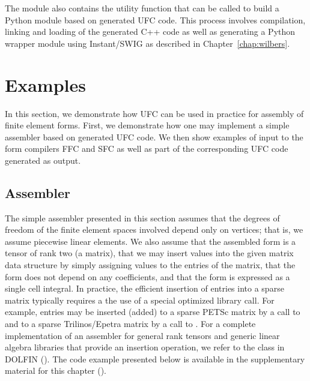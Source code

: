 The  module also contains the utility function
 that can be called to build a Python module
based on generated UFC code. This process involves compilation,
linking and loading of the generated C++ code as well as generating a
Python wrapper module using Instant/SWIG as described in
Chapter~\ref{chap:wilbers}.

\section{Examples}
\label{sec:alnes-2:examples}

In this section, we demonstrate how UFC can be used in practice for
assembly of finite element forms. First, we demonstrate how one may
implement a simple assembler based on generated UFC code. We then show
examples of input to the form compilers FFC and SFC as well as part of
the corresponding UFC code generated as output.

\subsection{Assembler}

The simple assembler presented in this section assumes that the
degrees of freedom of the finite element spaces involved depend only
on vertices; that is, we assume piecewise linear elements. We also
assume that the assembled form is a tensor of rank two (a matrix),
that we may insert values into the given matrix data structure by
simply assigning values to the entries of the matrix, that the form
does not depend on any coefficients, and that the form is expressed as
a single cell integral. In practice, the efficient insertion of
entries into a sparse matrix typically requires a the use of a special
optimized library call. For example, entries may be inserted (added)
to a sparse PETSc matrix by a call to  and to a
sparse Trilinos/Epetra matrix by a call to
. For a complete implementation of an
assembler for general rank tensors and generic linear algebra
libraries that provide an insertion operation, we refer to the class
 in DOLFIN (). The code example
presented below is available in the supplementary material for this
chapter ().

